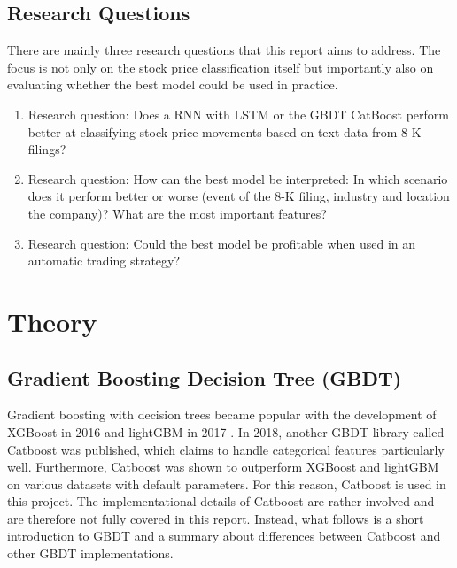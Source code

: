 \documentclass{article}
\begin{document}


	\subsection{Research Questions}
	
	There are mainly three research questions that this report aims to address. The focus is not only on the stock price classification itself but importantly also on evaluating whether the best model could be used in practice.
	
	\begin{enumerate}
		\item Research question: Does a RNN with LSTM or the GBDT CatBoost perform better at classifying stock price movements based on text data from 8-K filings?
		\item Research question: How can the best model be interpreted: In which scenario does it perform better or worse (event of the 8-K filing, industry and location the company)? What are the most important features? 
		\item Research question: Could the best model be profitable when used in an automatic trading strategy?
	
	\end{enumerate}

	\section{Theory}
	
	\subsection{Gradient Boosting Decision Tree (GBDT)}
	
	Gradient boosting with decision trees became popular with the development of XGBoost in 2016 \cite{chen_xgboost:_2016} and lightGBM in 2017 \cite{ke_lightgbm:_2017}. In 2018, another GBDT library called Catboost was published, which claims to handle categorical features particularly well. Furthermore, Catboost was shown to outperform XGBoost and lightGBM on various datasets with default parameters. For this reason, Catboost is used in this project. The implementational details of Catboost are rather involved and are therefore not fully covered in this report. Instead, what follows is a short introduction to GBDT and a summary about differences between Catboost and other GBDT implementations.
\end{document}
